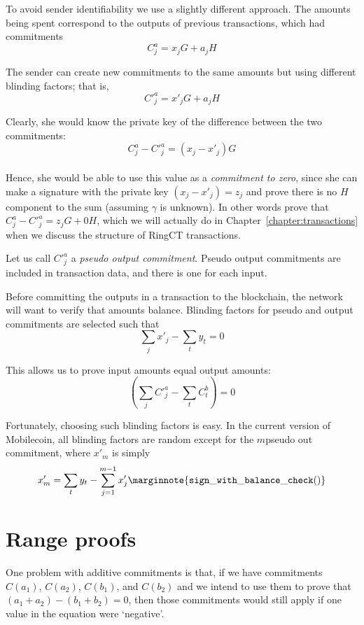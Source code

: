 To avoid sender identifiability we use a slightly different approach. The amounts being spent correspond to the outputs of previous transactions, which had commitments\vspace{.175cm}
\[C^a_{j} = x_j G + a_j H\]

The sender can create new commitments to the same amounts but using different blinding factors; that is,
\[C'^a_{j} = x'_j G + a_j H\]

Clearly, she would know the private key of the difference between the two commitments: \vspace{.175cm}
\[C^a_{j} - C'^a_{j} = (x_j - x'_j) G\]\\
Hence, she would be able to use this value as a {\em commitment to zero}, since she can make a signature with the private key $(x_j - x'_j) = z_j$ and prove there is no $H$ component to the sum (assuming $\gamma$ is unknown). In other words prove that $C^a_{j} - C'^a_{j} = z_j G + 0H$, which we will actually do in Chapter~\ref{chapter:transactions} when we discuss the structure of RingCT transactions.

Let us call $C'^a_j$ a {\em pseudo output commitment}. Pseudo output commitments are included in transaction data, and there is one for each input.

Before committing the outputs in a transaction to the blockchain, the network will want to verify that amounts balance. Blinding factors for pseudo and output commitments are selected such that\vspace{.175cm}
\[\sum_j x'_j  - \sum_t y_t = 0\]

This allows us to prove input amounts equal output amounts:\vspace{.175cm}
\[(\sum_j C'^a_{j} - \sum_t C^b_{t}) = 0\]

Fortunately, choosing such blinding factors is easy. In the current version of Mobilecoin, all blinding factors are random except for the $m$\nth pseudo out commitment, where $x'_m$ is simply
\[x'_m = \sum_t y_t - \sum_{j=1}^{m-1} x'_j\marginnote{{\tt sign\_with\_ balance\_ check()}}\]



\section{Range proofs}
\label{sec:range_proofs}

One problem with additive commitments is that, if we have commitments $C(a_1)$, $C(a_2)$, $C(b_1)$, and $C(b_2)$ and we intend to use them to prove that $(a_1 + a_2) - (b_1 + b_2) = 0$, then those commitments would still apply if one value in the equation were `negative'.

